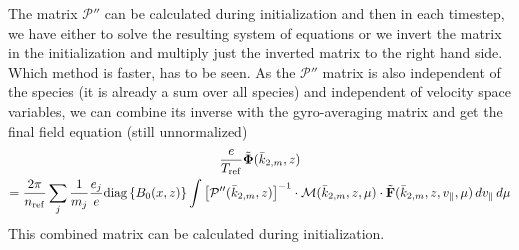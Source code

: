 The matrix $\mathcal{P}''$ can be calculated during initialization and
then in each timestep, we have either to solve the resulting system of
equations or we invert the matrix in the initialization and multiply
just the inverted matrix to the right hand side. Which method is
faster, has to be seen.
As the $\mathcal{P}''$ matrix is also independent of the species (it is already a sum
over all species) and independent of velocity space variables, we can
combine its inverse with the gyro-averaging matrix and get the final
field equation (still unnormalized)
\begin{multline*}
  \frac{e}{T_{\mathrm{ref}}} \tilde{\mathbf{\Phi}}(\bar{k}_{2,m},z) \\
  = \frac{2\pi}{n_{\mathrm{ref}}}\sum_j \frac{1}{m_j}\frac{e_j}{e}\mbox{diag}\,\{B_0(x,z)\}\int 
  \left[\mathcal{P}''(\bar{k}_{2,m},z)\right]^{-1}\cdot\mathcal{M}(\bar{k}_{2,m},z,\mu)\cdot\tilde{\mathbf{F}}(\bar{k}_{2,m},z,v_\|,\mu)\,dv_\|\,d\mu
\end{multline*}
This combined matrix can be calculated during initialization.

